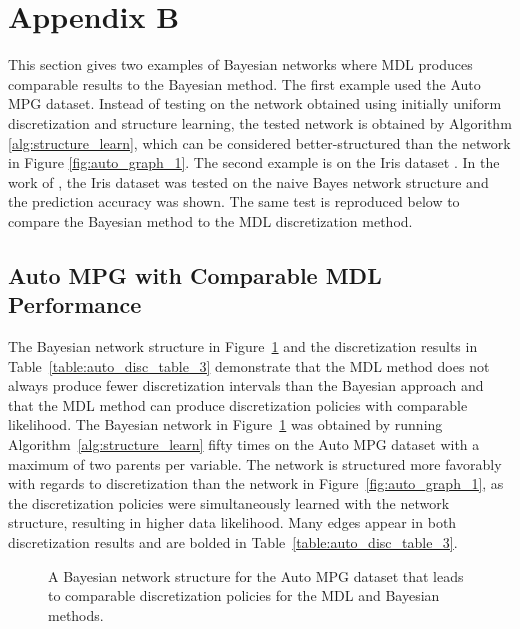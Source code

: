 \documentclass[twoside,11pt]{article}
\newcommand{\citep}[1]{\cite{#1}}
\newcommand{\citet}[1]{\citeauthor{#1} \citeyear{#1}}
\begin{document}
\section*{Appendix B}
\label{sec:appendixB}

This section gives two examples of Bayesian networks where MDL produces comparable results to the Bayesian method.
The first example used the Auto MPG dataset.
Instead of testing on the network obtained using initially uniform discretization and structure learning, the tested network is obtained by Algorithm \ref{alg:structure_learn}, which can be considered better-structured than the network in Figure \ref{fig:auto_graph_1}.
The second example is on the Iris dataset \citep{Lichman_2013}.
In the work of \citet{Friedman_1996}, the Iris dataset was tested on the naive Bayes network structure and the prediction accuracy was shown.
The same test is reproduced below to compare the Bayesian method to the MDL discretization method.

\subsection*{Auto MPG with Comparable MDL Performance}
The Bayesian network structure in Figure~\ref{fig:auto_graph_3} and the discretization results in Table~\ref{table:auto_disc_table_3} demonstrate that the MDL method does not always produce fewer discretization intervals than the Bayesian approach and that the MDL method can produce discretization policies with comparable likelihood.
The Bayesian network in Figure~\ref{fig:auto_graph_3} was obtained by running Algorithm~\ref{alg:structure_learn} fifty times on the Auto MPG dataset with a maximum of two parents per variable.
The network is structured more favorably with regards to discretization than the network in Figure~\ref{fig:auto_graph_1}, as the discretization policies were simultaneously learned with the network structure, resulting in higher data likelihood.
Many edges appear in both discretization results and are bolded in Table~\ref{table:auto_disc_table_3}.

\begin{figure}[ht]
  \centering
  \scalebox{0.8}{}
  \caption{A Bayesian network structure for the Auto MPG dataset that leads to comparable discretization policies for the MDL and Bayesian methods.}
  \label{fig:auto_graph_3}
\end{figure}

\begin{table}[ht]
  \centering
  \caption{
    The discretization policies for the Auto MPG dataset with the fixed structure shown in Figure~\ref{fig:auto_graph_3}.
    The methods have the same discretization for variable $A$, and the log-likelihood for the Bayesian method is only slightly better than that for the MDL method.
  }

  \label{table:auto_disc_table_3}
\end{table}
\end{document}
